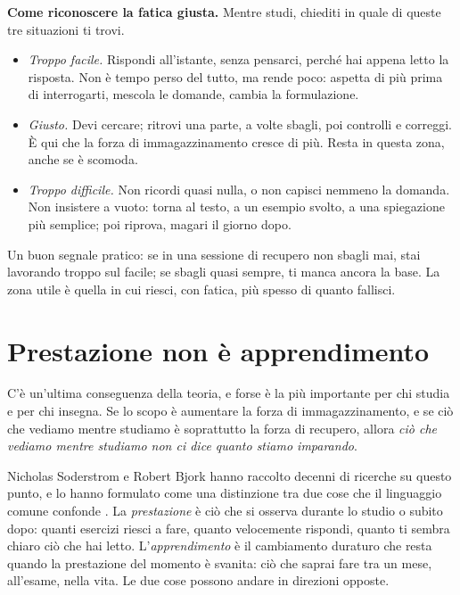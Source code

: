 \begin{inpratica}
\textbf{Come riconoscere la fatica giusta.} Mentre studi, chiediti in
quale di queste tre situazioni ti trovi.
\begin{itemize}
  \item \emph{Troppo facile.} Rispondi all'istante, senza pensarci,
        perché hai appena letto la risposta. Non è tempo perso del
        tutto, ma rende poco: aspetta di più prima di interrogarti,
        mescola le domande, cambia la formulazione.
  \item \emph{Giusto.} Devi cercare; ritrovi una parte, a volte
        sbagli, poi controlli e correggi. È qui che la forza di
        immagazzinamento cresce di più. Resta in questa zona, anche se
        è scomoda.
  \item \emph{Troppo difficile.} Non ricordi quasi nulla, o non capisci
        nemmeno la domanda. Non insistere a vuoto: torna al testo, a un
        esempio svolto, a una spiegazione più semplice; poi riprova,
        magari il giorno dopo.
\end{itemize}
Un buon segnale pratico: se in una sessione di recupero non sbagli mai,
stai lavorando troppo sul facile; se sbagli quasi sempre, ti manca
ancora la base. La zona utile è quella in cui riesci, con fatica, più
spesso di quanto fallisci.
\end{inpratica}

\section{Prestazione non è apprendimento}

C'è un'ultima conseguenza della teoria, e forse è la più importante per
chi studia e per chi insegna. Se lo scopo è aumentare la forza di
immagazzinamento, e se ciò che vediamo mentre studiamo è soprattutto la
forza di recupero, allora \emph{ciò che vediamo mentre studiamo non ci
dice quanto stiamo imparando}.

Nicholas Soderstrom e Robert Bjork hanno raccolto decenni di ricerche
su questo punto, e lo hanno formulato come una distinzione tra due
cose che il linguaggio comune confonde \parencite{soderstrom2015}. La
\emph{prestazione} è ciò che si osserva durante lo studio o subito
dopo: quanti esercizi riesci a fare, quanto velocemente rispondi, quanto
ti sembra chiaro ciò che hai letto. L'\emph{apprendimento} è il
cambiamento duraturo che resta quando la prestazione del momento è
svanita: ciò che saprai fare tra un mese, all'esame, nella vita. Le due
cose possono andare in direzioni opposte.

